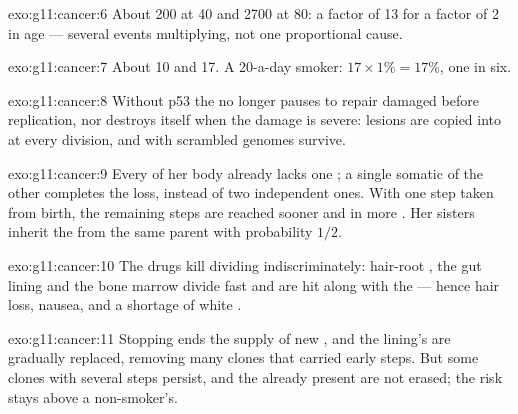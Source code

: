 \begin{solution}{exo:g11:cancer:6}
About 200 at 40 and 2700 at 80: a factor of 13 for a factor of 2 in
age --- several events multiplying, not one proportional cause.
\end{solution}

\begin{solution}{exo:g11:cancer:7}
About 10 and 17. A 20-a-day smoker: $17 \times 1\% = 17\%$, one in
six.
\end{solution}

\begin{solution}{exo:g11:cancer:8}
Without p53 the  no longer pauses to repair damaged  before
replication, nor destroys itself when the damage is severe: lesions
are copied into  at every division, and  with
scrambled genomes survive.
\end{solution}

\begin{solution}{exo:g11:cancer:9}
Every  of her body already lacks one ; a single somatic
 of the other completes the loss, instead of two independent
ones. With one step taken from birth, the remaining steps are reached
sooner and in more . Her sisters inherit the  from the
same parent with probability $1/2$.
\end{solution}

\begin{solution}{exo:g11:cancer:10}
The drugs kill dividing  indiscriminately: hair-root , the
gut lining and the bone marrow divide fast and are hit along with the
 --- hence hair loss, nausea, and a shortage of white .
\end{solution}

\begin{solution}{exo:g11:cancer:11}
Stopping ends the supply of new , and the lining's  are
gradually replaced, removing many clones that carried early steps.
But some clones with several steps persist, and the  already
present are not erased; the risk stays above a non-smoker's.
\end{solution}

